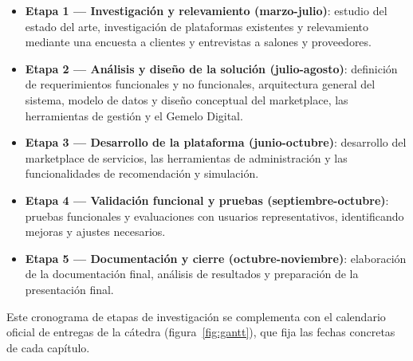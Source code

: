 \begin{itemize}
    \item \textbf{Etapa 1 — Investigación y relevamiento (marzo-julio)}: estudio
          del estado del arte, investigación de plataformas existentes y
          relevamiento mediante una encuesta a clientes y entrevistas a
          salones y proveedores.
    \item \textbf{Etapa 2 — Análisis y diseño de la solución
          (julio-agosto)}: definición de requerimientos funcionales y no
          funcionales, arquitectura general del sistema, modelo de datos
          y diseño conceptual del marketplace, las herramientas de
          gestión y el Gemelo Digital.
    \item \textbf{Etapa 3 — Desarrollo de la plataforma
          (junio-octubre)}: desarrollo del marketplace de servicios,
          las herramientas de administración y las funcionalidades de recomendación y simulación.
    \item \textbf{Etapa 4 — Validación funcional y pruebas
          (septiembre-octubre)}: pruebas funcionales y evaluaciones con
          usuarios representativos, identificando mejoras y ajustes
          necesarios.
    \item \textbf{Etapa 5 — Documentación y cierre (octubre-noviembre)}:
          elaboración de la documentación final, análisis de resultados y
          preparación de la presentación final.
\end{itemize}

Este cronograma de etapas de investigación se complementa con el
calendario oficial de entregas de la cátedra (figura~\ref{fig:gantt}),
que fija las fechas concretas de cada capítulo.

